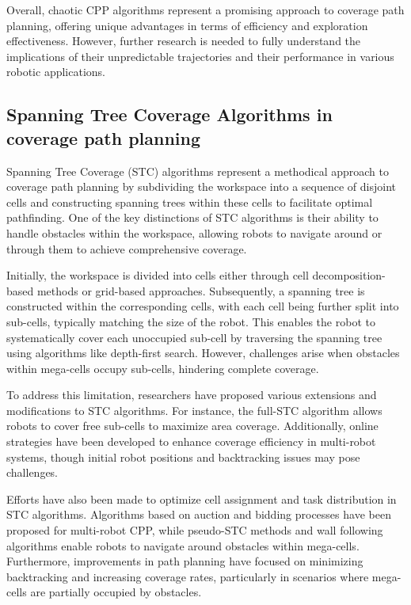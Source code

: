 \vspace*{6mm}

Overall, chaotic CPP algorithms represent a promising approach to coverage path planning, offering unique advantages in terms of efficiency and exploration effectiveness. However, further research is needed to fully understand the implications of their unpredictable trajectories and their performance in various robotic applications.


\subsection{Spanning Tree Coverage Algorithms in coverage path planning}

Spanning Tree Coverage (STC) algorithms represent a methodical approach to coverage path planning by subdividing the workspace into a sequence of disjoint cells and constructing spanning trees within these cells to facilitate optimal pathfinding. One of the key distinctions of STC algorithms is their ability to handle obstacles within the workspace, allowing robots to navigate around or through them to achieve comprehensive coverage.

\vspace*{6mm}

Initially, the workspace is divided into cells either through cell decomposition-based methods or grid-based approaches. Subsequently, a spanning tree is constructed within the corresponding cells, with each cell being further split into sub-cells, typically matching the size of the robot. This enables the robot to systematically cover each unoccupied sub-cell by traversing the spanning tree using algorithms like depth-first search. However, challenges arise when obstacles within mega-cells occupy sub-cells, hindering complete coverage.

\vspace*{6mm}

To address this limitation, researchers have proposed various extensions and modifications to STC algorithms. For instance, the full-STC algorithm allows robots to cover free sub-cells to maximize area coverage. Additionally, online strategies have been developed to enhance coverage efficiency in multi-robot systems, though initial robot positions and backtracking issues may pose challenges.

\vspace*{6mm}

Efforts have also been made to optimize cell assignment and task distribution in STC algorithms. Algorithms based on auction and bidding processes have been proposed for multi-robot CPP, while pseudo-STC methods and wall following algorithms enable robots to navigate around obstacles within mega-cells. Furthermore, improvements in path planning have focused on minimizing backtracking and increasing coverage rates, particularly in scenarios where mega-cells are partially occupied by obstacles.


